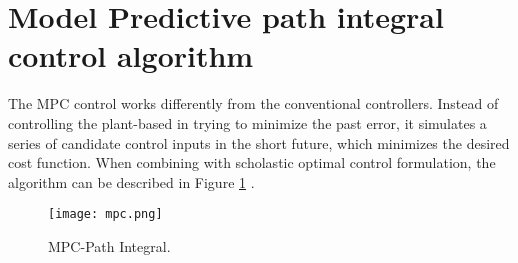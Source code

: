 \documentclass[]{hdsr}
\begin{document}
\newpage

\section{Model Predictive path integral control algorithm}
\label{appendix-customize-this-label2}

The MPC control works differently from the conventional controllers. Instead of controlling the plant-based in trying to minimize the past error, it simulates a series of candidate control inputs in the short future, which minimizes the desired cost function. When combining with scholastic optimal control formulation, the algorithm can be described in Figure \ref{fig:mpc} \citep{williams2016aggressive}.

\begin{figure}[H]
    \centering
    \texttt{[image: mpc.png]} \\
    \caption{MPC-Path Integral.}
    \label{fig:mpc}
\end{figure}

\newpage

\printbibliography
\end{document}
